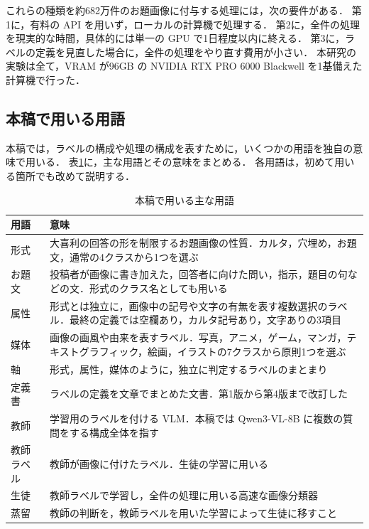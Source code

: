 これらの種類を約682万件のお題画像に付与する処理には，次の要件がある．
第1に，有料の API を用いず，ローカルの計算機で処理する．
第2に，全件の処理を現実的な時間，具体的には単一の GPU で1日程度以内に終える．
第3に，ラベルの定義を見直した場合に，全件の処理をやり直す費用が小さい．
本研究の実験は全て，VRAM が96GB の NVIDIA RTX PRO 6000 Blackwell を1基備えた計算機で行った．

\subsection{本稿で用いる用語}
本稿では，ラベルの構成や処理の構成を表すために，いくつかの用語を独自の意味で用いる．
表\ref{tab_terms}に，主な用語とその意味をまとめる．
各用語は，初めて用いる箇所でも改めて説明する．

\begin{table}[t]
    \centering
    \caption{本稿で用いる主な用語}
    \label{tab_terms}
    \small
    \begin{tabular}{>{\raggedright\arraybackslash}p{}>{\raggedright\arraybackslash}p{}}
        \toprule
        用語 & 意味 \\
        \midrule
        形式 & 大喜利の回答の形を制限するお題画像の性質．カルタ，穴埋め，お題文，通常の4クラスから1つを選ぶ \\
        お題文 & 投稿者が画像に書き加えた，回答者に向けた問い，指示，題目の句などの文．形式のクラス名としても用いる \\
        属性 & 形式とは独立に，画像中の記号や文字の有無を表す複数選択のラベル．最終の定義では空欄あり，カルタ記号あり，文字ありの3項目 \\
        媒体 & 画像の画風や由来を表すラベル．写真，アニメ，ゲーム，マンガ，テキストグラフィック，絵画，イラストの7クラスから原則1つを選ぶ \\
        軸 & 形式，属性，媒体のように，独立に判定するラベルのまとまり \\
        定義書 & ラベルの定義を文章でまとめた文書．第1版から第4版まで改訂した \\
        教師 & 学習用のラベルを付ける VLM．本稿では Qwen3-VL-8B に複数の質問をする構成全体を指す \\
        教師ラベル & 教師が画像に付けたラベル．生徒の学習に用いる \\
        生徒 & 教師ラベルで学習し，全件の処理に用いる高速な画像分類器 \\
        蒸留 & 教師の判断を，教師ラベルを用いた学習によって生徒に移すこと \\

\end{tabular}
\end{table}
